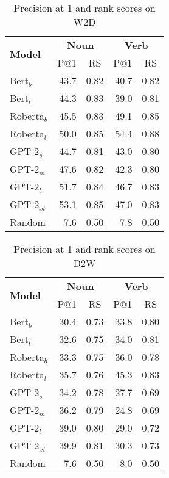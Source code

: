 \documentclass[11pt,a4paper]{article}
\begin{document}
\begin{table}
    \centering
    \begin{tabular}{l|rrrr}
        \hline
         \multirow{2}{*}{\textbf{Model}} & \multicolumn{2}{c}{\textbf{Noun}} & \multicolumn{2}{c}{\textbf{Verb}} \\
         & \multicolumn{1}{c}{P@1} & \multicolumn{1}{c}{RS} & \multicolumn{1}{c}{P@1} & \multicolumn{1}{c}{RS} \\ \hline
     Bert$_{b}$ & 43.7 & 0.82 & 40.7 & 0.82 \\
     Bert$_{l}$ & 44.3 & 0.83 & 39.0 & 0.81 \\
     Roberta$_{b}$ & 45.5 & 0.83 & 49.1 & 0.85 \\
     Roberta$_{l}$ & 50.0 & 0.85 & 54.4 & 0.88 \\ \hline
     GPT-2$_{s}$ & 44.7 & 0.81 & 43.0 & 0.80 \\
     GPT-2$_{m}$ & 47.6 & 0.82 & 42.3 & 0.80 \\
     GPT-2$_{l}$ & 51.7 & 0.84 & 46.7 & 0.83 \\
     GPT-2$_{xl}$ & 53.1 & 0.85 & 47.0 & 0.83 \\ \hline 
     Random & 7.6 & 0.50 & 7.8 & 0.50 \\\hline
     
    \end{tabular}
    \caption{Precision at 1 and rank scores on W2D}
    \label{tab:results_find_the_definition}
\end{table}


\begin{table}
    \centering
    \begin{tabular}{l|rrrr}
        \hline
         \multirow{2}{*}{\textbf{Model}} & \multicolumn{2}{c}{\textbf{Noun}} & \multicolumn{2}{c}{\textbf{Verb}} \\
         & \multicolumn{1}{c}{P@1} & \multicolumn{1}{c}{RS} & \multicolumn{1}{c}{P@1} & \multicolumn{1}{c}{RS} \\ \hline
     Bert$_{b}$ & 30.4 & 0.73 & 33.8 & 0.80 \\
     Bert$_{l}$ & 32.6 & 0.75 & 34.0 & 0.81 \\
     Roberta$_{b}$ & 33.3 & 0.75 & 36.0 & 0.78 \\
     Roberta$_{l}$ & 35.7 & 0.76 & 45.3 & 0.83 \\ \hline
     GPT-2$_{s}$ & 34.2 & 0.78 & 27.7 & 0.69 \\
     GPT-2$_{m}$ & 36.2 & 0.79 & 24.8 & 0.69 \\
     GPT-2$_{l}$ & 39.0 & 0.80 & 29.0 & 0.72 \\
     GPT-2$_{xl}$ & 39.9 & 0.81 & 30.3 & 0.73 \\ \hline 
     Random & 7.6 & 0.50 & 8.0 & 0.50 \\\hline
     
    \end{tabular}
    \caption{Precision at 1 and rank scores on D2W}
    \label{tab:results_find_the_word}
\end{table}
\end{document}
